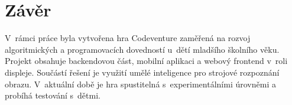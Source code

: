 \chapter{Závěr}

V~rámci práce byla vytvořena hra Codeventure zaměřená na rozvoj algoritmických a programovacích dovedností u~dětí mladšího školního věku. Projekt obsahuje backendovou část, mobilní aplikaci a webový frontend v~roli displeje. Součástí řešení je využití umělé inteligence pro strojové rozpoznání obrazu. V~aktuální době je hra spustitelná s~experimentálními úrovněmi a probíhá testování s~dětmi.